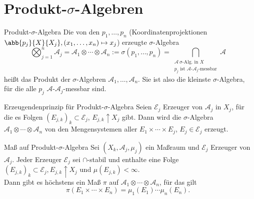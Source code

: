 \section*{Produkt-\(\sigma\)-Algebren}

\begin{karte}{Produkt-\(\sigma\)-Algebra}
    Die von den \( p_1, \ldots, p_n \) (Koordinatenprojektionen \(\abb{p_j}{X}{X_j}, (x_1,\ldots,x_n) \mapsto x_j\)) erzeugte 
    \( \sigma\)-Algebra 
    \[ \bigotimes_{j=1}^n \mathcal{A}_j 
    = \mathcal{A}_1 \otimes \cdots \otimes \mathcal{A}_n 
    := \sigma(p_1,\ldots, p_n) 
    = \bigcap_{\substack{\mathcal{A} \ \sigma\text{-Alg. in }X\\ p_j \text{ ist \(\mathcal{A}\)-\(\mathcal{A}_j\)-messbar} }} \mathcal{A} \]
    heißt das Produkt der \( \sigma \)-Algebren \( \mathcal{A}_1,\ldots, \mathcal{A}_n \). 
    Sie ist also die kleinste \( \sigma \)-Algebra, für die alle \( p_j  \)
    \( \mathcal{A} \)-\( \mathcal{A}_j \)-messbar sind.
\end{karte}

\begin{karte}{Erzeugendenprinzip für Produkt-\(\sigma\)-Algebra}
    Seien \( \mathcal{E}_j \) Erzeuger von \( \mathcal{A}_j \)
    in \(X_j\), für die es Folgen \( (E_{j,k})_k \subset \mathcal{E}_j \), 
    \( E_{j,k} \uparrow X_j \) gibt.
    Dann wird die \( \sigma \)-Algebra 
    \( \mathcal{A}_1 \otimes \cdots \otimes \mathcal{A}_n \) 
    von den Mengensystemen aller \( E_1 \times \cdots \times E_j \), 
    \( E_j \in \mathcal{E}_j \) erzeugt.
\end{karte}

\begin{karte}{Maß auf Produkt-\(\sigma\)-Algebra}
    Sei \( (X_k, \mathcal{A}_j, \mu_j) \) ein Maßraum und 
    \( \mathcal{E}_j \) Erzeuger von \( \mathcal{A}_j \). 
    Jeder Erzeuger \( \mathcal{E}_j \) sei \(\cap\)-stabil 
    und enthalte eine Folge \( (E_{j,k})_k \subset \mathcal{E}_j, 
    E_{j,k} \uparrow X_j \) und \( \mu(E_{j,k}) < \infty \).\\
    Dann gibt es höchstens ein Maß \(\pi\) auf 
    \( \mathcal{A}_1 \otimes \cdots \otimes \mathcal{A}_n \), 
    für das gilt 
    \[ \pi(E_1 \times \cdots \times E_n) 
    = \mu_1(E_1) \cdots \mu_n(E_n). \]
\end{karte}